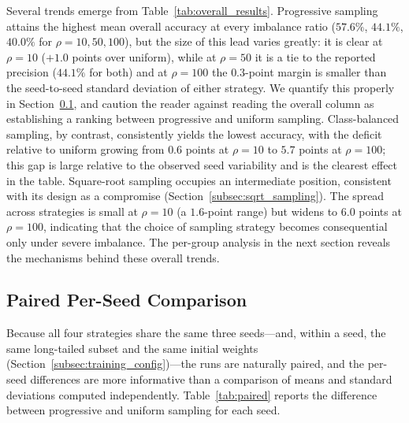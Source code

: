 \documentclass[12pt,a4paper]{article}
\begin{document}
Several trends emerge from Table~\ref{tab:overall_results}. Progressive sampling attains the highest mean overall accuracy at every imbalance ratio ($57.6\%$, $44.1\%$, $40.0\%$ for $\rho = 10, 50, 100$), but the size of this lead varies greatly: it is clear at $\rho = 10$ ($+1.0$ points over uniform), while at $\rho = 50$ it is a tie to the reported precision ($44.1\%$ for both) and at $\rho = 100$ the $0.3$-point margin is smaller than the seed-to-seed standard deviation of either strategy. We quantify this properly in Section~\ref{sec:paired}, and caution the reader against reading the overall column as establishing a ranking between progressive and uniform sampling. Class-balanced sampling, by contrast, consistently yields the lowest accuracy, with the deficit relative to uniform growing from $0.6$ points at $\rho = 10$ to $5.7$ points at $\rho = 100$; this gap is large relative to the observed seed variability and is the clearest effect in the table. Square-root sampling occupies an intermediate position, consistent with its design as a compromise (Section~\ref{subsec:sqrt_sampling}). The spread across strategies is small at $\rho = 10$ (a $1.6$-point range) but widens to $6.0$ points at $\rho = 100$, indicating that the choice of sampling strategy becomes consequential only under severe imbalance. The per-group analysis in the next section reveals the mechanisms behind these overall trends.

\subsection{Paired Per-Seed Comparison}
\label{sec:paired}

Because all four strategies share the same three seeds---and, within a seed, the same long-tailed subset and the same initial weights (Section~\ref{subsec:training_config})---the runs are naturally paired, and the per-seed differences are more informative than a comparison of means and standard deviations computed independently. Table~\ref{tab:paired} reports the difference between progressive and uniform sampling for each seed.
\end{document}
